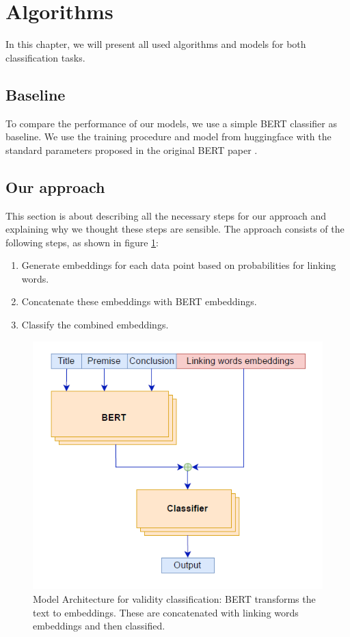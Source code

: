 \section{Algorithms}
In this chapter, we will present all used algorithms and models for both classification tasks.

\subsection{Baseline}
To compare the performance of our models, we use a simple BERT classifier \cite{bert} as baseline. We use the training procedure and model from huggingface \cite{berttraining} with the standard parameters proposed in the original BERT paper \cite{bert}.

\subsection{Our approach}

This section is about describing all the necessary steps for our approach and explaining why we thought these steps are sensible. The approach consists of the following steps, as shown in figure \ref{fig:model-architecture1}:

\begin{enumerate}
	\item Generate embeddings for each data point based on probabilities for linking words.
	\item Concatenate these embeddings with BERT embeddings.
	\item Classify the combined embeddings.
\end{enumerate}

\begin{figure}[h]
  \centering
  \includegraphics[scale=0.8]{fig/model_diag1.png}
  \caption{Model Architecture for validity classification: BERT transforms the text to embeddings. These are concatenated with linking words embeddings and then classified.}%
  \label{fig:model-architecture1}
\end{figure}


